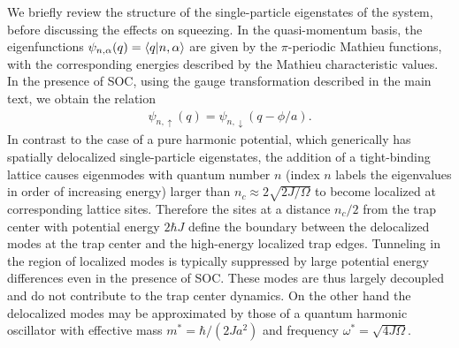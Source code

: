 \documentclass[aps,prx,superscriptaddress,notitlepage,twocolumn,longbibliography]{revtex4-2}
\begin{document}
We briefly review the structure of the single-particle eigenstates of the system, before discussing the effects on squeezing. In the quasi-momentum basis, the eigenfunctions $\psi_{n,\alpha}(q) = \braket{q|n,\alpha}$ are given by the $\pi$-periodic Mathieu functions, with the corresponding energies described by the Mathieu characteristic values\cite{rey2005ultracold}. In the presence of SOC, using  the gauge transformation described in the main text, we obtain the relation
\begin{gather}
    \psi_{n,\uparrow}(q) = \psi_{n,\downarrow}(q-\phi/a).
    \label{eq:trap_states}
\end{gather}
In contrast to the case of a pure harmonic potential, which generically has spatially delocalized single-particle eigenstates, the addition of a tight-binding lattice causes eigenmodes with quantum number $n$ (index $n$ labels the eigenvalues in order of increasing energy) larger than $n_c \approx 2\sqrt{2J/\Omega}$ to become localized at corresponding lattice sites. Therefore the  sites at a distance $n_c/2$ from the trap center with  potential energy $2\hbar J$ define  the boundary between the delocalized modes at the trap center and the high-energy localized trap edges. Tunneling in the region of  localized modes is typically suppressed by large potential energy differences even in the presence of SOC. These modes are thus largely decoupled and do not contribute to the trap center dynamics. On the other hand the delocalized modes may be approximated by those of a quantum harmonic oscillator with effective mass $m^{*} = \hbar/(2Ja^2)$ and frequency $\omega^* = \sqrt{4J\Omega}$.
\end{document}
